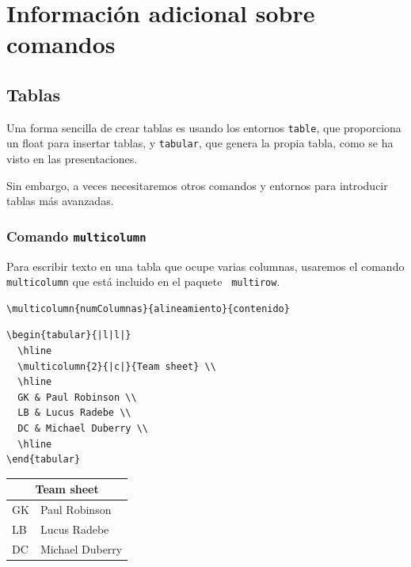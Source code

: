 \documentclass[12pt,a4paper, oneside]{report}
\begin{document}
	
	\maketitle
	\newpage
	\tableofcontents
	
\chapter{Información adicional sobre comandos}

\section{Tablas}

Una forma sencilla de crear tablas es usando los entornos \verb+table+, que proporciona un float para insertar tablas, y \verb+tabular+, que genera la propia tabla, como se ha visto en las presentaciones.

Sin embargo, a veces necesitaremos otros comandos y entornos para introducir tablas más avanzadas.

\subsection{Comando \texttt{multicolumn}}

Para escribir texto en una tabla que ocupe varias columnas, usaremos el comando \texttt{multicolumn} que está incluido en el paquete \ \verb+multirow+.
\begin{verbatim}\multicolumn{numColumnas}{alineamiento}{contenido}\end{verbatim}

\begin{lstlisting}
\begin{tabular}{|l|l|}
  \hline
  \multicolumn{2}{|c|}{Team sheet} \\
  \hline
  GK & Paul Robinson \\
  LB & Lucus Radebe \\
  DC & Michael Duberry \\
  \hline
\end{tabular}
\end{lstlisting}

\begin{tabular}{|l|l|}
  \hline
  \multicolumn{2}{|c|}{Team sheet} \\
  \hline
  GK & Paul Robinson \\
  LB & Lucus Radebe \\
  DC & Michael Duberry \\
  \hline
\end{tabular}
\end{document}
